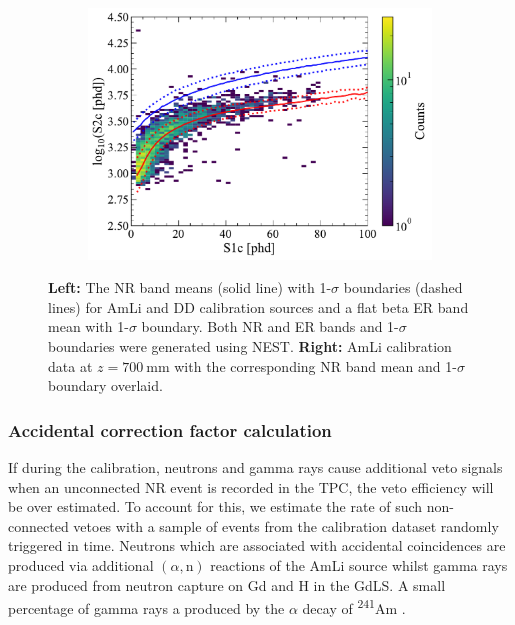 \begin{enumerate}
\begin{figure}[!ht]
\begin{subfigure}[b]{0.49\textwidth}
        \includegraphics[width=\textwidth]{figures/VetoEfficiency/AmLi700_NRBands.pdf}
        \caption{}
        \label{fig:VetoEff/AmLi700_NRBands}
    \end{subfigure}
    \caption{\textbf{Left:} The NR band means (solid line) with 1-$\sigma$ boundaries (dashed lines) for AmLi and DD calibration sources and a flat beta ER band mean with 1-$\sigma$ boundary. Both NR and ER bands and 1-$\sigma$ boundaries were generated using NEST. \textbf{Right:} AmLi calibration data at $z=700~\text{mm}$ with the corresponding NR band mean and 1-$\sigma$ boundary overlaid.}
    \label{fig:VetoEff/SR3NRBands&AmLi700mmData}
\end{figure}
\end{enumerate}

\subsubsection{Accidental correction factor calculation}\label{sec:VetoEff/AmLiAccCorrection}
If during the calibration, neutrons and gamma rays cause additional veto signals when an unconnected NR event is recorded in the TPC, the veto efficiency will be over estimated. To account for this, we estimate the rate of such non-connected vetoes with a sample of events from the calibration dataset randomly triggered in time. Neutrons which are associated with accidental coincidences are produced via additional $(\alpha,\text{n})$ reactions of the AmLi source whilst gamma rays are produced from neutron capture on Gd and H in the GdLS. A small percentage of gamma rays a produced by the $\alpha$ decay of \textsuperscript{241}Am \cite{Sazzad:2023uqs}.

